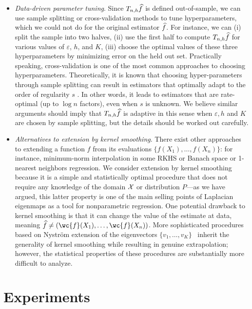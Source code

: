 \begin{itemize}
	\item \emph{Data-driven parameter tuning}. Since $T_{n,h}\widehat{f}$ is defined out-of-sample, we can use sample splitting or cross-validation methods to tune hyperparameters, which we could not do for the original estimator $\widehat{f}$. For instance, we can (i) split the sample into two halves, (ii) use the first half to compute $T_{n,h}\widehat{f}$ for various values of $\varepsilon$, $h$, and $K$, (iii) choose the optimal values of these three hyperparameters by minimizing error on the held out set. Practically speaking, cross-validation is one of the most common approaches to choosing hyperparameters. Theoretically, it is known that choosing hyper-parameters through sample splitting can result in estimators that optimally adapt to the order of regularity $s$ \citep{gyorfi2006}. In other words, it leads to estimators that are rate-optimal (up to $\log n$ factors), even when $s$ is unknown. We believe similar arguments should imply that $T_{n,h}\widehat{f}$ is adaptive in this sense when $\varepsilon,h$ and $K$ are chosen by sample splitting, but the details should be worked out carefully.
	
	\item \emph{Alternatives to extension by kernel smoothing}. There exist other approaches to extending a function $f$ from its evaluations $\{f(X_1),\ldots,f(X_n)\}$: for instance, minimum-norm interpolation in some RKHS or Banach space or 1-nearest neighbors regression.  We consider extension by kernel smoothing because it is a simple and statistically optimal procedure that does not require any knowledge of the domain $\mathcal{X}$ or distribution $P$---as we have argued, this latter property is one of the main selling points of Laplacian eigenmaps as a tool for nonparametric regression. One potential drawback to kernel smoothing is that it can change the value of the estimate at data, meaning $\wh{f} \neq (\wc{f}(X_1),\ldots, \wc{f}(X_n))$. More sophisticated procedures based on Nystr\"{o}m extension of the eigenvectors $\{v_1,\ldots,v_K\}$~\citep{fowlkes2004} inherit the generality of kernel smoothing while resulting in genuine extrapolation; however, the statistical properties of these procedures are substantially more difficult to analyze. 
\end{itemize}

\section{Experiments}
\label{sec:experiments}

